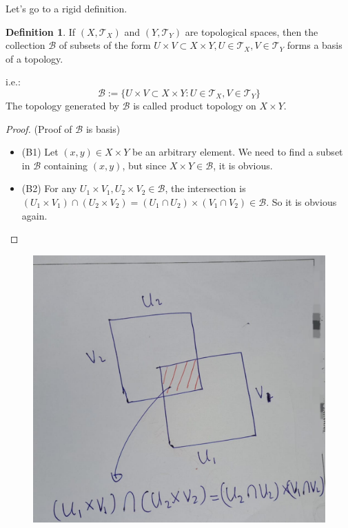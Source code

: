 \documentclass[
]{book}
\theoremstyle{definition}
\newtheorem{definition}{Definition}[chapter]
\theoremstyle{definition}
\theoremstyle{definition}
\theoremstyle{definition}
\theoremstyle{remark}
\begin{document}
Let's go to a rigid definition.

\begin{definition}
\protect\hypertarget{def:unnamed-chunk-34}{}\label{def:unnamed-chunk-34}If \(\left(X, \mathcal{T}_{X}\right)\) and \(\left(Y, \mathcal{T}_{Y}\right)\) are topological spaces, then the collection \(\mathcal{B}\) of subsets of the form \(U \times V \subset X \times Y, U \in \mathcal{T}_{X}, V \in \mathcal{T}_{Y}\) forms a basis of a topology.

i.e.:
\[\mathcal{B}:=\{U \times V \subset X \times Y: U \in \mathcal{T}_{X}, V \in \mathcal{T}_{Y}\}\]
The topology generated by \(\mathcal{B}\) is called product topology on \(X \times Y\).
\end{definition}

\begin{proof}

(Proof of \(\mathcal{B}\) is basis)

\begin{itemize}
\item
  (B1) Let \((x, y) \in X \times Y\) be an arbitrary element. We need to find a subset in \(\mathcal{B}\) containing \((x, y)\), but since \(X \times Y \in \mathcal{B}\), it is obvious.
\item
  (B2) For any \(U_{1} \times V_{1}, U_{2} \times V_{2} \in \mathcal{B}\), the intersection is \(\left(U_{1} \times V_{1}\right) \cap\left(U_{2} \times V_{2}\right)=\left(U_{1} \cap U_{2}\right) \times\left(V_{1} \cap V_{2}\right) \in \mathcal{B}\). So it is obvious again.
\end{itemize}

\end{proof}

\begin{figure}
\centering
\includegraphics{figures/figure 09.jpg}
\caption{\label{fig:fig09}\(~\)}
\end{figure}
\end{document}
